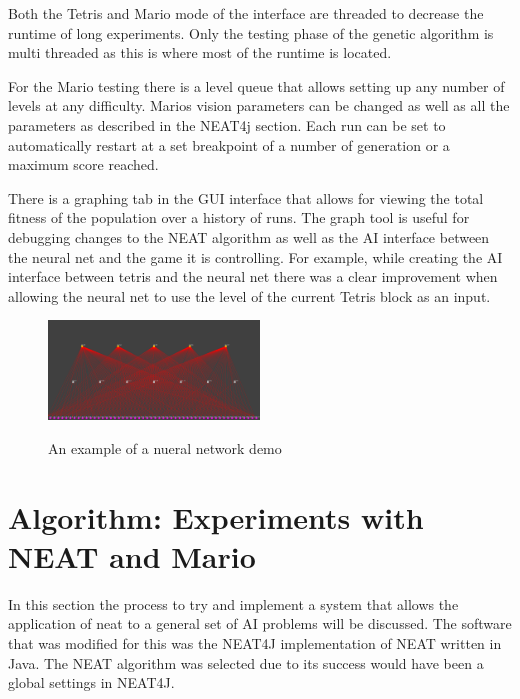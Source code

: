 \documentclass[12pt]{ucthesis} \newif\ifpdf \ifx\pdfoutput\undefined
\begin{document}
Both the Tetris and Mario mode of the interface are threaded to decrease the
runtime of long experiments. Only the testing phase of the genetic algorithm is
multi threaded as this is where most of the runtime is located.

For the Mario testing there is a level queue that allows setting up any number
of levels at any difficulty.  Marios vision parameters can be changed as well as
all the parameters as described in the NEAT4j section. Each run can be set to
automatically restart at a set breakpoint of a number of generation or a maximum
score reached.

There is a graphing tab in the GUI interface that allows for viewing the total
fitness of the population over a history of runs. The graph tool is useful for
debugging changes to the NEAT algorithm as well as the AI interface between the
neural net and the game it is controlling. For example, while creating the AI
interface between tetris and the neural net there was a clear improvement when
allowing the neural net to use the level of the current Tetris block as an
input. 

\begin{figure}[h!]
  \caption{An example of a nueral network demo}
  \centering
    \includegraphics[width=0.5\textwidth]{simplemarionet.png}
   \label{fig:simplemarionet} 
\end{figure}


\chapter{Algorithm: Experiments with NEAT and Mario}


In this section the process to try and implement a system that allows the
application of neat to a general set of AI problems will be discussed. The
software that was modified for this was the NEAT4J implementation of NEAT
written in Java. The NEAT algorithm was selected due to its success would have
been a global settings in NEAT4J.
\end{document}
